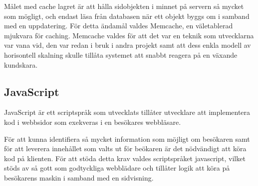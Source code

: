 Målet med cache lagret är att hålla sidobjekten i minnet på servern så mycket som mögligt, och endast läsa från databasen när ett objekt byggs om i samband med en uppdatering. För detta ändamål valdes Memcache, en väletablerad mjukvara för caching. Memcache valdes för att det var en teknik som utvecklarna var vana vid, den var redan i bruk i andra projekt samt att dess enkla modell av horisontell skalning skulle tillåta systemet att snabbt reagera på en växande kundskara.

\subsection{JavaScript}

JavaScript är ett scriptspråk som utvecklats tillåter utvecklare att implementera kod i webbsidor som exekveras i en besökares webbläsare. 

För att kunna identifiera så mycket information som möjligt om besökaren samt för att leverera innehållet som valts ut för beökaren är det nödvändigt att köra kod på klienten. För att stöda detta krav valdes scriptspråket javascript, vilket stöds av så gott som godtyckliga webblädare och tillåter logik att köra på besökarens maskin i samband med en sidvisning.

